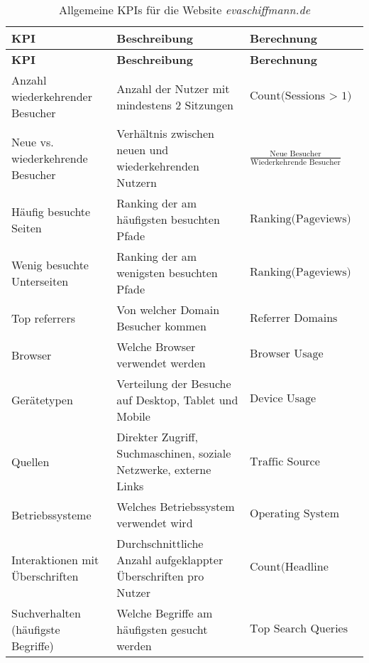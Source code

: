 \renewcommand{\arraystretch}{1.5} %
\begin{xltabular}{\textwidth}{|X|X|X|}
    \caption{Allgemeine KPIs für die Website \textit{evaschiffmann.de}} \label{tab:kpi_uebersicht} \\
    \hline
    \textbf{KPI} & \textbf{Beschreibung} & \textbf{Berechnung} \\ \hline
    \endfirsthead

    \hline
    \textbf{KPI} & \textbf{Beschreibung} & \textbf{Berechnung} \\ \hline
    \endhead

    \hline
    \endfoot

    \hline
    \endlastfoot

    Anzahl wiederkehrender Besucher & Anzahl der Nutzer mit mindestens 2 Sitzungen & {\footnotesize \(\text{Count(Sessions > 1)}\)} \\ \hline
    Neue vs. wiederkehrende Besucher & Verhältnis zwischen neuen und wiederkehrenden Nutzern & {\footnotesize \(\frac{\text{Neue Besucher}}{\text{Wiederkehrende Besucher}}\)} \\ \hline
    Häufig besuchte Seiten & Ranking der am häufigsten besuchten Pfade & {\footnotesize \(\text{Ranking(Pageviews)}\)} \\ \hline
    Wenig besuchte Unterseiten & Ranking der am wenigsten besuchten Pfade & {\footnotesize \(\text{Ranking(Pageviews)}\)} \\ \hline
    Top referrers & Von welcher Domain Besucher kommen & {\footnotesize \(\text{Referrer Domains}\)} \\ \hline
    Browser & Welche Browser verwendet werden & {\footnotesize \(\text{Browser Usage Statistics}\)} \\ \hline
    Gerätetypen & Verteilung der Besuche auf Desktop, Tablet und Mobile & {\footnotesize \(\text{Device Usage Statistics}\)} \\ \hline
    Quellen & Direkter Zugriff, Suchmaschinen, soziale Netzwerke, externe Links & {\footnotesize \(\text{Traffic Source Breakdown}\)} \\ \hline
    Betriebssysteme & Welches Betriebssystem verwendet wird & {\footnotesize \(\text{Operating System Share}\)} \\ \hline
    Interaktionen mit Überschriften & Durchschnittliche Anzahl aufgeklappter Überschriften pro Nutzer & {\footnotesize \(\text{Count(Headline Interactions)}\)} \\ \hline
    Suchverhalten (häufigste Begriffe) & Welche Begriffe am häufigsten gesucht werden & {\footnotesize \(\text{Top Search Queries}\)} \\ \hline

\end{xltabular}
